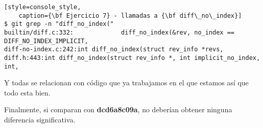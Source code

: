 \begin{lstlisting}[style=console_style,
	caption={\bf Ejercicio 7} - llamadas a {\bf diff\_no\_index}]
$ git grep -n "diff_no_index("
builtin/diff.c:332:             diff_no_index(&rev, no_index == DIFF_NO_INDEX_IMPLICIT, 
diff-no-index.c:242:int diff_no_index(struct rev_info *revs,
diff.h:443:int diff_no_index(struct rev_info *, int implicit_no_index, int,
\end{lstlisting}

Y todas se relacionan con código que ya trabajamos en el que estamos así que todo esta bien.

Finalmente, si comparan con {\bf dcd6a8c09a}, no deberían obtener ninguna diferencia significativa.

